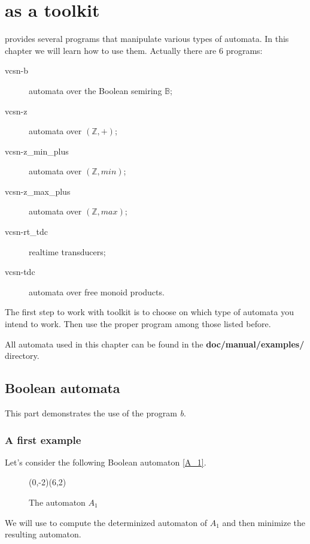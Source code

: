 \chapter{\Vauc as a toolkit}

\Vauc provides several programs that manipulate various types of
automata. In this chapter we will learn how to use them.  Actually
there are 6 programs:
\begin{description}
\item [vcsn-b] automata over the Boolean semiring $\mathbb{B}$;
\item [vcsn-z] automata over $(\mathbb{Z},+)$;
\item [vcsn-z\_min\_plus] automata over $(\mathbb{Z},min)$;
\item [vcsn-z\_max\_plus] automata over $(\mathbb{Z},max)$;
\item [vcsn-rt\_tdc] realtime transducers;
\item [vcsn-tdc] automata over free monoid products.
\end{description}

The first step to work with \Vauc toolkit is to choose on which type
of automata you intend to work. Then use the proper program among
those listed before.

All automata used in this chapter can be found in the
\textbf{doc/manual/examples/} directory.

\newpage

\section{Boolean automata}

This part demonstrates the use of the program \textit{b}.

\subsection{A first example}

Let's consider the following Boolean automaton \autoref{A_1}.
\begin{figure}[ht] \centering
  \begin{VCPicture}{(0,-2)(6,2)}
      
     
     
       
  \end{VCPicture}
  \caption{The automaton $A_1$}
  \label{A_1}
\end{figure}
We will use \Vauc to compute the determinized automaton of $A_1$ and
then minimize the resulting automaton.

